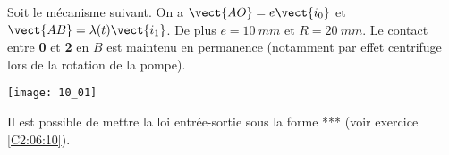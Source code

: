 \normaltrue \difficilefalse \tdifficilefalse
\correctionfalse


\setcounter{question}{0}%
\ifcorrection
\else
{}
\fi

\ifprof
\else
Soit le mécanisme suivant. On a $\vect{AO}=e\vect{i_0}$ et $\vect{AB}=\lambda(t)\vect{i_1}$. De plus $e=\SI{10}{mm}$ et $R=\SI{20}{mm}$. Le contact entre \textbf{0} et \textbf{2} en $B$ est maintenu en permanence (notamment par effet centrifuge lors de la rotation de la pompe).
\begin{marginfigure}
\texttt{[image: 10\_01]}
\end{marginfigure}
\fi

Il est possible de mettre la loi entrée-sortie sous la forme *** (voir exercice \ref{C2:06:10}).

\ifprof
\else
\fi

\ifprof
\else
\fi


\ifprof
\else


\fi